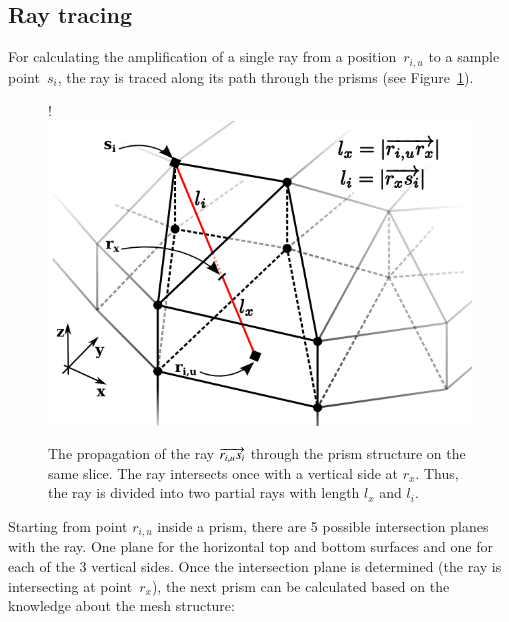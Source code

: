 \subsection{Ray tracing} \label{subsec:raytracing}
For calculating the amplification of a single ray from a position~$r_{i,u}$ to a sample
point~$s_i$, the ray is traced along its path through the prisms (see Figure~\ref{graphic:prism_propagation}). 

\begin{figure}[H]
  \centerline{
     {!} {\includegraphics{./graphics/prism_propagation_4.png}}
  }


  \caption{The propagation of the ray
    $\protect\overrightarrow{r_{i,u}s_i}$ through the prism
    structure on the same slice. The ray intersects once with a
    vertical side at $r_x$. Thus, the ray is divided into two
    partial rays with length $l_x$ and $l_i$.}
  \label{graphic:prism_propagation}
\end{figure}
Starting from point $r_{i,u}$ inside a prism, there are 5 possible intersection
planes with the ray. One plane for the horizontal top and bottom surfaces and one for each
of the 3 vertical sides. Once the intersection plane is determined (the ray is
intersecting at point~$r_x$), the next prism can be calculated based on the
knowledge about the mesh structure:

